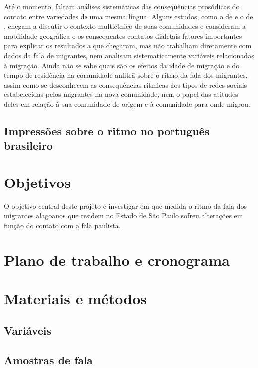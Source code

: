 \documentclass[
    a4paper,	%
    12pt,	%
    ]{article}	%
\begin{document}
Até o momento, faltam análises sistemáticas das consequências prosódicas do
contato entre variedades de uma mesma língua. Alguns estudos, como o de
\citet{Torgersen.Szakay2012} e o de \citet{Fagyal2010}, chegam a discutir o
contexto multiétnico de suas comunidades e consideram a mobilidade geográfica e
os consequentes contatos dialetais fatores importantes para explicar os
resultados a que chegaram, mas não trabalham diretamente com dados da fala de
migrantes, nem analisam sistematicamente variáveis relacionadas à migração.
Ainda não se sabe quais são os efeitos da idade de migração e do tempo de
residência na comunidade anfitrã sobre o ritmo da fala dos migrantes, assim como
se desconhecem as consequências rítmicas dos tipos de redes sociais
estabelecidas pelos migrantes na nova comunidade, nem o papel das atitudes deles
em relação à sua comunidade de origem e à comunidade para onde migrou.

\subsection{Impressões sobre o ritmo no português brasileiro}


\section{Objetivos} 
\label{objetivos}

O objetivo central deste projeto é investigar em que medida o ritmo da fala dos
migrantes alagoanos que residem no Estado de São Paulo sofreu alterações em
função do contato com a fala paulista.

\section{Plano de trabalho e cronograma} 
\label{plano}
	
\section{Materiais e métodos} 
\label{metodo}

	\subsection{Variáveis} 
	\label{variaveis}

	\subsection{Amostras de fala} 
	\label{amostra}
	
\end{document}
